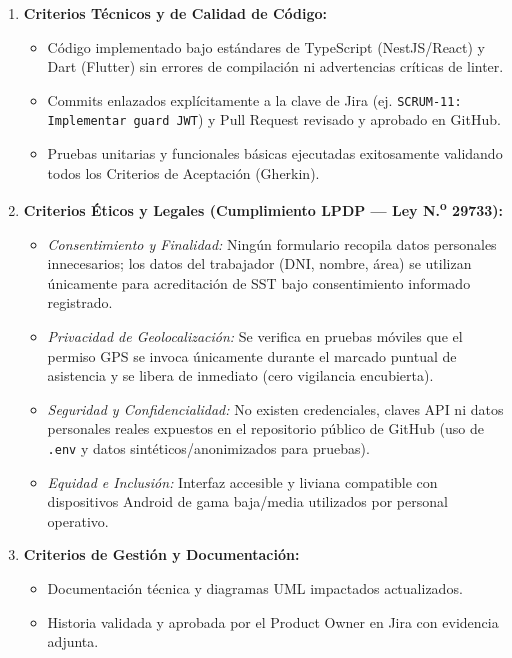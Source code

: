 \documentclass[11pt,a4paper]{article}
\begin{document}
\begin{enumerate}[leftmargin=1.5em, itemsep=0.3em]
    \item \textbf{Criterios Técnicos y de Calidad de Código:}
    \begin{itemize}[leftmargin=1.2em]
        \item Código implementado bajo estándares de TypeScript (NestJS/React) y Dart (Flutter) sin errores de compilación ni advertencias críticas de linter.
        \item Commits enlazados explícitamente a la clave de Jira (ej. \texttt{SCRUM-11: Implementar guard JWT}) y Pull Request revisado y aprobado en GitHub.
        \item Pruebas unitarias y funcionales básicas ejecutadas exitosamente validando todos los Criterios de Aceptación (Gherkin).
    \end{itemize}
    \item \textbf{Criterios Éticos y Legales (Cumplimiento LPDP --- Ley N.\textsuperscript{o} 29733):}
    \begin{itemize}[leftmargin=1.2em]
        \item \textit{Consentimiento y Finalidad:} Ningún formulario recopila datos personales innecesarios; los datos del trabajador (DNI, nombre, área) se utilizan únicamente para acreditación de SST bajo consentimiento informado registrado.
        \item \textit{Privacidad de Geolocalización:} Se verifica en pruebas móviles que el permiso GPS se invoca únicamente durante el marcado puntual de asistencia y se libera de inmediato (cero vigilancia encubierta).
        \item \textit{Seguridad y Confidencialidad:} No existen credenciales, claves API ni datos personales reales expuestos en el repositorio público de GitHub (uso de \texttt{.env} y datos sintéticos/anonimizados para pruebas).
        \item \textit{Equidad e Inclusión:} Interfaz accesible y liviana compatible con dispositivos Android de gama baja/media utilizados por personal operativo.
    \end{itemize}
    \item \textbf{Criterios de Gestión y Documentación:}
    \begin{itemize}[leftmargin=1.2em]
        \item Documentación técnica y diagramas UML impactados actualizados.
        \item Historia validada y aprobada por el Product Owner en Jira con evidencia adjunta.
    \end{itemize}
\end{enumerate}
\end{document}
